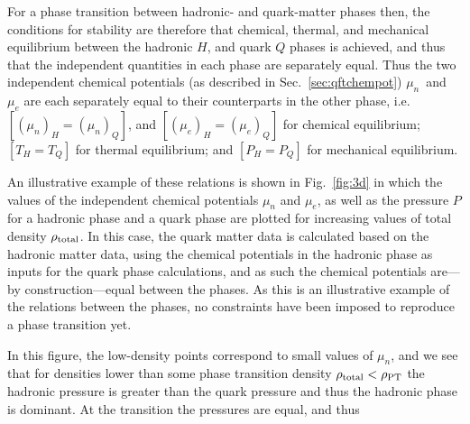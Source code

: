 \documentclass[11pt,a4paper,twoside]{carrollthesis}
\newcommand{\be}{\begin{equation}}
\newcommand{\ee}{\end{equation}}
\newcommand{\emdash}{\hspace{1pt}---\hspace{1pt}}
\begin{document}
%
For a phase transition between hadronic- and quark-matter phases then,
the conditions for stability are therefore that chemical, thermal, and
mechanical equilibrium between the hadronic $H$, and quark $Q$ phases
is achieved, and thus that the independent quantities in each phase
are separately equal. Thus the two independent chemical potentials (as
described in Sec.~\ref{sec:qftchempot}) $\mu_n$~and~$\mu_e$ are each
separately equal to their counterparts in the other phase,
i.e. $\left[(\mu_n)_H=(\mu_n)_Q\right]$, and
$\left[(\mu_e)_H=(\mu_e)_Q\right]$ for chemical equilibrium;
$\left[T_H=T_Q\right]$ for thermal equilibrium; and $\left[P_H =
  P_Q\right]$ for mechanical equilibrium.\par
%
An illustrative example of these relations is shown in
Fig.~\ref{fig:3d} in which the values of the independent chemical
potentials $\mu_n$ and $\mu_e$, as well as the pressure $P$ for a
hadronic phase and a quark phase are plotted for increasing values of
total density $\rho_{\rm total}$. In this case, the quark matter data
is calculated based on the hadronic matter data, using the chemical
potentials in the hadronic phase as inputs for the quark phase
calculations, and as such the chemical potentials are\emdash by
construction\emdash equal between the phases. As this is an
illustrative example of the relations between the phases, no
constraints have been imposed to reproduce a phase transition yet.\par
%
In this figure, the low-density points correspond to small values of
$\mu_n$, and we see that for densities lower than some phase
transition density $\rho_{\rm total} < \rho_{\rm PT}$ the hadronic
pressure is greater than the quark pressure and thus the hadronic
phase is dominant. At the transition the pressures are equal, and thus
\end{document}
